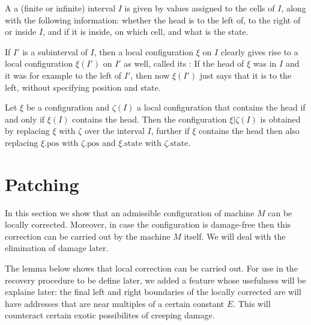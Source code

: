 \documentclass[12pt]{memoir}
\def\B{B}
\newcommand{\E}{E}
\newcommand{\pos}{\mathrm{pos}}
\newcommand{\state}{\mathrm{state}}
\begin{document}
\begin{definition}
\label{def:local-config}
  A  a (finite or infinite)
  interval \( I \) is given by values assigned to the cells
  of \( I \), along with the following information: whether
  the head is to the left of, to the right of or inside
  \( I \), and if it is inside, on which cell, and what is
  the state.

  If \( I' \) is a subinterval of \( I \), then a local configuration
  \( \xi \) on \( I \) clearly gives rise to a local configuration
  \( \xi(I') \) on \( I' \) as well, called its
  : If the head of \( \xi \) was in \( I \)
  and it was for example to the left of \( I' \), then now
  \( \xi(I') \) just says that it is to the left, without
  specifying position and state.

  Let \( \xi \) be a configuration and \( \zeta(I) \) a local
  configuration that contains the head if and only if
  \( \xi(I) \) contains the head.
  Then the configuration \( \xi|\zeta(I) \) is obtained by
  replacing \( \xi \) with \( \zeta \) over the interval \( I \),
  further if \( \xi \) contains the head then also replacing
  \( \xi.\pos \) with \( \zeta.\pos \) and \( \xi.\state \) with
  \( \zeta.\state \).
\end{definition}


\section{Patching}\label{sec:patching}

In this section we show that an admissible configuration of machine \( M \)
can be locally corrected.
Moreover, in case the configuration is damage-free then this correction
can be carried out by the machine \( M \) itself.
We will deal with the elimination of damage later.

The lemma below shows that local correction can be carried out.
For use in the recovery procedure to be define later, we added a feature
whose usefulness will be explaine later: the final left and right boundaries
of the locally corrected are will have addresses that are near multiples
of a certain constant \( \E \).
This will counteract certain exotic possibilites of creeping damage.

\end{document}
